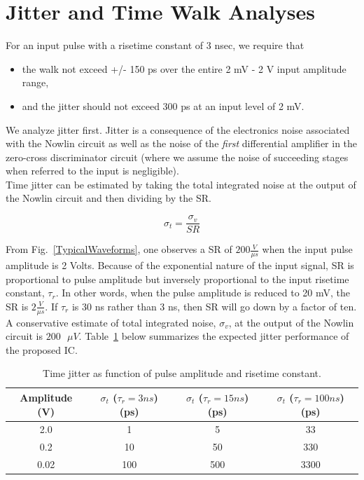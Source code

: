 \documentclass[12pt, onecolumn]{IEEEtran}
\begin{document}
\section*{Jitter and Time Walk Analyses}

\noindent
For an input pulse with a risetime constant of 3 nsec, we require that \\

\begin{itemize}
\item
the walk not exceed +/- 150 ps over the entire 2 mV - 2 V input amplitude range,
\item
and the jitter should not exceed 300 ps at an input level of 2 mV.
\end{itemize}

\noindent
\newline
We analyze jitter first.  Jitter is a consequence of the electronics noise associated with the Nowlin circuit as well as the noise of the \emph{first} differential amplifier in the zero-cross discriminator circuit (where we assume the noise of succeeding stages when referred to the input is negligible).\\

\noindent
Time jitter can be estimated by taking the total integrated noise at the output of the Nowlin circuit and then dividing by the SR.

\begin{equation*}
\sigma_t = \frac{\sigma_v}{SR}
\end{equation*}


\noindent
\newline
From Fig.~\ref{TypicalWaveforms}, one observes a SR of $200 \frac{V}{\mu s}$ when the input pulse amplitude is 2 Volts.  Because of the exponential nature of the input signal, SR is proportional to pulse amplitude but inversely proportional to the input risetime constant, $\tau_r$. In other words, when the pulse amplitude is reduced to 20 mV, the SR is $2 \frac{V}{\mu s}$. If $\tau_r$ is 30 ns rather than 3 ns, then SR will go down by a factor of ten.  A conservative estimate of total integrated noise, $\sigma_v$, at the output of the Nowlin circuit is $200 \text{ } \mu V$.  Table~\ref{JitterTable} below summarizes the expected jitter performance of the proposed IC.\\


\begin{table}[htbp!]
\begin{center}
\begin{tabular}{||c | c | c | c||} 
\hline
Amplitude (V) & $\sigma_t$ ($\tau_r = 3 ns$) (ps) & $\sigma_t$ ($\tau_r = 15 ns$) (ps) & $\sigma_t$ ($\tau_r = 100 ns$) (ps) \\ [0.5ex] 
\hline\hline
2.0 & 1 & 5 & 33\\ 
\hline
0.2 & 10 & 50 & 330  \\
\hline
0.02 & 100  & 500  & 3300\\ [1ex] 
\hline
\end{tabular}
\end{center}
\caption{Time jitter as function of pulse amplitude and risetime constant.}
\label{JitterTable}
\end{table}
\end{document}

